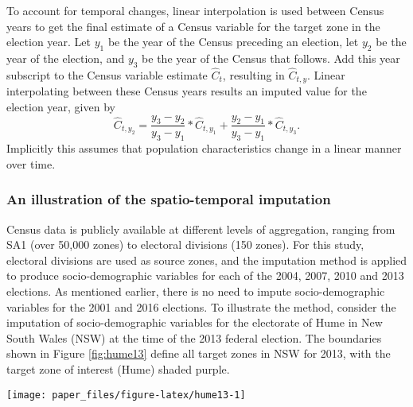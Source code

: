 \documentclass[times, doublespace]{anzsauth}
\let\origfigure\figure
\let\endorigfigure\endfigure
\renewenvironment{figure}[1][2] {
    \expandafter\origfigure\expandafter[htbp]
} {
    \endorigfigure
}
\begin{document}
\enlargethispage*{0.5cm}

To account for temporal changes, linear interpolation is used between Census years to get the final estimate of a Census variable for the target zone in the election year. Let \(y_1\) be the year of the Census preceding an election, let \(y_2\) be the year of the election, and \(y_3\) be the year of the Census that follows. Add this year subscript to the Census variable estimate \(\hat{C}_t\), resulting in \(\hat{C}_{t,y}\). Linear interpolating between these Census years results an imputed value for the election year, given by
\[
  \hat{C}_{t,y_2} = \frac{y_3-y_2}{y_3-y_1} * \hat{C}_{t,y_1} +
    \frac{y_2-y_1}{y_3-y_1} * \hat{C}_{t,y_3}.
\]
Implicitly this assumes that population characteristics change in a linear manner over time.

\hypertarget{an-illustration-of-the-spatio-temporal-imputation}{%
\subsubsection*{An illustration of the spatio-temporal imputation}\label{an-illustration-of-the-spatio-temporal-imputation}}

Census data is publicly available at different levels of aggregation, ranging from SA1 (over 50,000 zones) to electoral divisions (150 zones). For this study, electoral divisions are used as source zones, and the imputation method is applied to produce socio-demographic variables for each of the 2004, 2007, 2010 and 2013 elections. As mentioned earlier, there is no need to impute socio-demographic variables for the 2001 and 2016 elections. To illustrate the method, consider the imputation of socio-demographic variables for the electorate of Hume in New South Wales (NSW) at the time of the 2013 federal election. The boundaries shown in Figure \ref{fig:hume13} define all target zones in NSW for 2013, with the target zone of interest (Hume) shaded purple.

\begin{figure}[h]

{\centering \texttt{[image: paper\_files/figure-latex/hume13-1]} 

}

\caption{Some of the electoral boundaries in NSW for 2013, with the electoral boundary for Hume shown in purple.}\label{fig:hume13}
\end{figure}
\end{document}
